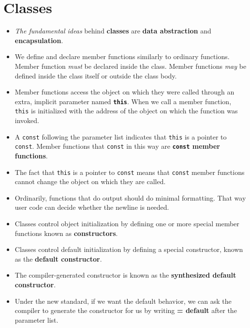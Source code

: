 \section{Classes}
\begin{itemize}

\item
\textit{The fundamental ideas} behind \textbf{classes} are \textbf{data abstraction} and \textbf{encapsulation}.

\item
We define and declare member functions similarly to ordinary functions. Member function \textit{must} be declared inside the class. Member functions \textit{may} be defined inside the class itself or outside the class body.

\item
Member functions access the object on which they were called through an extra, implicit parameter named \textbf{\texttt{this}}. When we call a member function, \texttt{this} is initialized with the address of the object on which the function was invoked.

\item
A \texttt{const} following the parameter list indicates that \texttt{this} is a pointer to \texttt{const}. Member functions that \texttt{const} in this way are \textbf{\texttt{const} member functions}.

\item
The fact that \texttt{this} is a pointer to \texttt{const} means that \texttt{const} member functions cannot change the object on which they are called.

\item
Ordinarily, functions that do output should do minimal formatting. That way user code can decide whether the newline is needed.

\item
Classes control object initialization by defining one or more special member functions known as \textbf{constructors}.

\item
Classes control default initialization by defining a special constructor, known as the \textbf{default constructor}.

\item
The compiler-generated constructor is known as the \textbf{synthesized default constructor}.

\item
Under the new standard, if we want the default behavior, we can ask the compiler to generate the constructor for us by writing \textbf{= default} after the parameter list.


\end{itemize}
